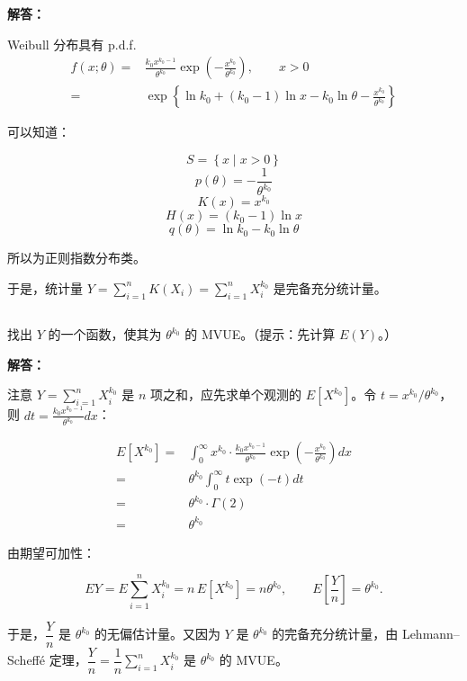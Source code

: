 \documentclass[12pt,a4paper]{article}
\begin{document}
\begin{answerbox}
\textbf{解答：}

Weibull 分布具有 p.d.f.
\[
\begin{aligned}
    f(x;\theta)=&\frac{k_0 x^{k_0-1}}{\theta^{k_0}}
    \exp\left(-\frac{x^{k_0}}{\theta^{k_0}}\right),\qquad x>0\\
    =& \exp\left\{\ln k_0 + (k_0-1)\ln x - k_0 \ln \theta - \frac{x^{k_0}}{\theta^{k_0}}\right\}
\end{aligned}
\]

可以知道：

$$
S = \left\{x \mid x >0 \right\}
$$
$$
p(\theta) = -\frac{1}{\theta^{k_0}}
$$
$$
K(x) = x^{k_0}
$$
$$
H(x) = (k_0-1)\ln x
$$
$$
q(\theta) = \ln k_0 - k_0 \ln \theta
$$

所以为正则指数分布类。

于是，统计量 $Y = \sum_{i=1}^{n} K(X_i) = \sum_{i=1}^{n} X_i^{k_0}$ 是完备充分统计量。


\end{answerbox}


\subsection{}

找出 $Y$ 的一个函数，使其为 $\theta^{k_0}$ 的 MVUE。（提示：先计算 $E(Y)$。）

\begin{answerbox}
\textbf{解答：}

注意 $Y = \sum_{i=1}^{n} X_i^{k_0}$ 是 $n$ 项之和，应先求单个观测的 $E\left[X^{k_0}\right]$。令 $t = x^{k_0}/\theta^{k_0}$，则 $dt = \frac{k_0 x^{k_0-1}}{\theta^{k_0}} dx$：

$$
\begin{aligned}
E\left[X^{k_0}\right] =& \int_{0}^{\infty} x^{k_0} \cdot \frac{k_0 x^{k_0-1}}{\theta^{k_0}} \exp\left(-\frac{x^{k_0}}{\theta^{k_0}}\right) dx \\
=& \theta^{k_0} \int_{0}^{\infty} t \exp(-t) dt \\
=& \theta^{k_0} \cdot \Gamma(2) \\
=& \theta^{k_0}
\end{aligned}
$$

由期望可加性：

$$
EY = E\sum_{i=1}^{n} X_i^{k_0} = n\,E\left[X^{k_0}\right] = n\theta^{k_0},
\qquad E\left[\frac{Y}{n}\right] = \theta^{k_0}.
$$

于是，$\dfrac{Y}{n}$ 是 $\theta^{k_0}$ 的无偏估计量。又因为 $Y$ 是 $\theta^{k_0}$ 的完备充分统计量，由 Lehmann--Scheffé 定理，$\dfrac{Y}{n} = \dfrac{1}{n}\sum_{i=1}^{n} X_i^{k_0}$ 是 $\theta^{k_0}$ 的 MVUE。

\end{answerbox}
\end{document}
